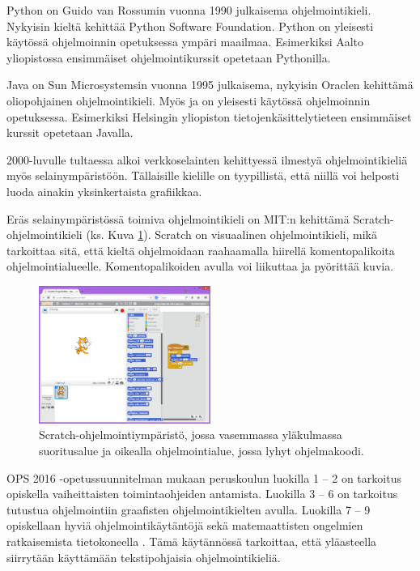 Python \cite{python} on
Guido van Rossumin vuonna 1990
julkaisema ohjelmointikieli.
Nykyisin kieltä kehittää
Python Software Foundation.
Python on yleisesti käytössä ohjelmoinnin
opetuksessa ympäri maailmaa.
Esimerkiksi Aalto yliopistossa
ensimmäiset ohjelmointikurssit
opetetaan Pythonilla.

Java \cite{java} on Sun Microsystemsin
vuonna 1995 julkaisema,
nykyisin Oraclen kehittämä
oliopohjainen ohjelmointikieli.
Myös ja on yleisesti käytössä
ohjelmoinnin opetuksessa.
Esimerkiksi Helsingin yliopiston
tietojenkäsittelytieteen ensimmäiset
kurssit opetetaan Javalla.


2000-luvulle tultaessa alkoi
verkkoselainten kehittyessä
ilmestyä ohjelmointikieliä
myös selainympäristöön.
Tällaisille kielille on tyypillistä,
että niillä voi helposti luoda
ainakin yksinkertaista grafiikkaa.

Eräs selainympäristössä toimiva
ohjelmointikieli on
MIT:n kehittämä
Scratch-ohjelmoin\-ti\-kieli
\cite{scratch}
(ks. Kuva \ref{img:scratch}).
Scratch on visuaalinen ohjelmointikieli,
mikä tarkoittaa sitä, että
kieltä ohjelmoidaan raahaamalla
hiirellä komentopalikoita
ohjelmointialueelle.
Komentopalikoiden avulla
voi liikuttaa ja pyörittää
kuvia.

\begin{figure}[h]
    \centering
    \includegraphics[width=0.5\textwidth]{scratch}
    \caption{Scratch-ohjelmointiympäristö, jossa vasemmassa yläkulmassa suoritusalue ja oikealla ohjelmointialue, jossa lyhyt ohjelmakoodi.}
    \label{img:scratch}
\end{figure}

OPS 2016 -opetussuunnitelman
mukaan peruskoulun luokilla
1 -- 2 on tarkoitus opiskella
vaiheittaisten toimintaohjeiden
antamista.
Luokilla 3 -- 6 on tarkoitus
tutustua ohjelmointiin
graafisten ohjelmointikielten
avulla.
Luokilla 7 -- 9 opiskellaan
hyviä ohjelmointikäytäntöjä
sekä matemaattisten ongelmien
ratkaisemista tietokoneella
\cite{OPS_2016}.
Tämä käytännössä tarkoittaa,
että yläasteella siirrytään
käyttämään tekstipohjaisia
ohjelmointikieliä.

